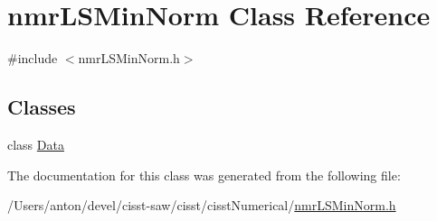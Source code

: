 \hypertarget{classnmr_l_s_min_norm}{}\section{nmr\+L\+S\+Min\+Norm Class Reference}
\label{classnmr_l_s_min_norm}


{\ttfamily \#include $<$nmr\+L\+S\+Min\+Norm.\+h$>$}

\subsection*{Classes}
\begin{DoxyCompactItemize}
\item 
class \hyperlink{classnmr_l_s_min_norm_1_1_data}{Data}
\end{DoxyCompactItemize}


The documentation for this class was generated from the following file\+:\begin{DoxyCompactItemize}
\item 
/\+Users/anton/devel/cisst-\/saw/cisst/cisst\+Numerical/\hyperlink{nmr_l_s_min_norm_8h}{nmr\+L\+S\+Min\+Norm.\+h}\end{DoxyCompactItemize}
